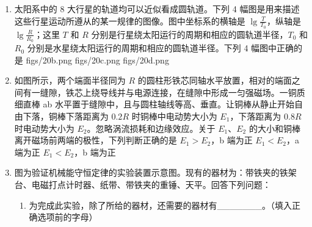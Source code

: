 \documentclass[\gkver]{gaokaozhenti}
\begin{document}
\begin{enumerate}
\item
太阳系中的 8 大行星的轨道均可以近似看成圆轨道。下列 4 幅图是用来描述这些行星运动所遵从的某一规律的图像。图中坐标系的横轴是 $\lg\frac{T}{T_{0}}$，纵轴是 $\lg\frac{R}{R_{0}}$；这里 $T$ 和 $R$ 分别是行星绕太阳运行的周期和相应的圆轨道半径，$T_{0}$ 和 $R_{0}$ 分别是水星绕太阳运行的周期和相应的圆轨道半径。下列 4 幅图中正确的是
{figs/20b.png}
{figs/20c.png}
{figs/20d.png}

\item
如图所示，两个端面半径同为 $R$ 的圆柱形铁芯同轴水平放置，相对的端面之间有一缝隙，铁芯上绕导线并与电源连接，在缝隙中形成一匀强磁场。一铜质细直棒 ab 水平置于缝隙中，且与圆柱轴线等高、垂直。让铜棒从静止开始自由下落，铜棒下落距离为 $0.2R$ 时铜棒中电动势大小为 $E_{1}$，下落距离为 $0.8R$ 时电动势大小为 $E_{2}$。忽略涡流损耗和边缘效应。关于 $E_{1}$、$E_{2}$ 的大小和铜棒离开磁场前两端的极性，下列判断正确的是
{$E_{1}>E_{2}$，b 端为正}
{$E_{1}<E_{2}$，a 端为正}
{$E_{1}<E_{2}$，b 端为正}

\item
图为验证机械能守恒定律的实验装置示意图。现有的器材为：带铁夹的铁架台、电磁打点计时器、纸带、带铁夹的重锤、天平。回答下列问题：
\begin{enumerate}
	\item
	为完成此实验，除了所给的器材，还需要的器材有\_\_\_\_\_\_\_。（填入正确选项前的字母）


\end{enumerate}
\end{enumerate}
\end{document}
